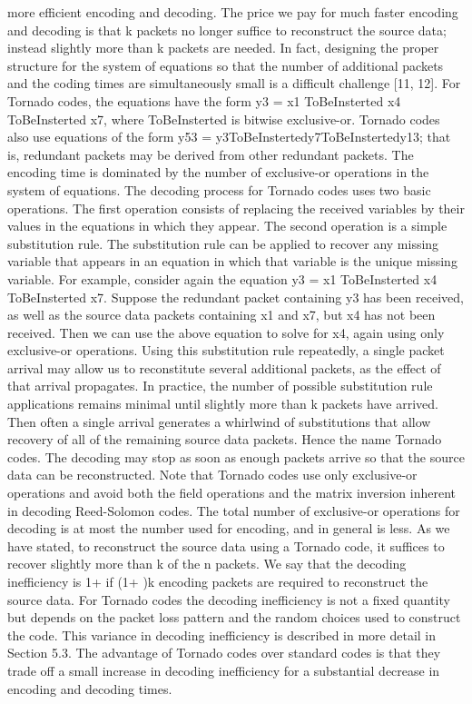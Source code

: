 \documentclass[12pt,a4paper,titlepage,twocolumn]{article}
\begin{document}
more efficient encoding and decoding. The price we
pay for much faster encoding and decoding is that k
packets no longer suffice to reconstruct the source data;
instead slightly more than k packets are needed. In
fact, designing the proper structure for the system of
equations so that the number of additional packets and
the coding times are simultaneously small is a difficult
challenge [11, 12].
For Tornado codes, the equations have the form y3 =
x1 ToBeInsterted x4 ToBeInsterted x7, where ToBeInsterted is bitwise exclusive-or. Tornado
codes also use equations of the form y53 = y3ToBeInstertedy7ToBeInstertedy13;
that is, redundant packets may be derived from other
redundant packets. The encoding time is dominated by
the number of exclusive-or operations in the system of
equations.
The decoding process for Tornado codes uses two
basic operations. The first operation consists of replacing
the received variables by their values in the equations
in which they appear. The second operation is a
simple substitution rule. The substitution rule can be
applied to recover any missing variable that appears in
an equation in which that variable is the unique missing
variable. For example, consider again the equation
y3 = x1 ToBeInsterted x4 ToBeInsterted x7. Suppose the redundant packet containing y3 has been received, as well as the source data
packets containing x1 and x7, but x4 has not been received.
Then we can use the above equation to solve
for x4, again using only exclusive-or operations. Using
this substitution rule repeatedly, a single packet arrival
may allow us to reconstitute several additional packets,
as the effect of that arrival propagates. In practice,
the number of possible substitution rule applications remains
minimal until slightly more than k packets have
arrived. Then often a single arrival generates a whirlwind
of substitutions that allow recovery of all of the
remaining source data packets. Hence the name Tornado
codes.
The decoding may stop as soon as enough packets arrive
so that the source data can be reconstructed. Note
that Tornado codes use only exclusive-or operations and
avoid both the field operations and the matrix inversion
inherent in decoding Reed-Solomon codes. The
total number of exclusive-or operations for decoding is
at most the number used for encoding, and in general
is less.
As we have stated, to reconstruct the source data using
a Tornado code, it suffices to recover slightly more
than k of the n packets. We say that the decoding inefficiency
is 1+
 if (1+
)k encoding packets are required
to reconstruct the source data. For Tornado codes the
decoding inefficiency is not a fixed quantity but depends
on the packet loss pattern and the random choices used
to construct the code. This variance in decoding inefficiency
is described in more detail in Section 5.3.
The advantage of Tornado codes over standard codes
is that they trade off a small increase in decoding inefficiency
for a substantial decrease in encoding and
decoding times.
\end{document}
